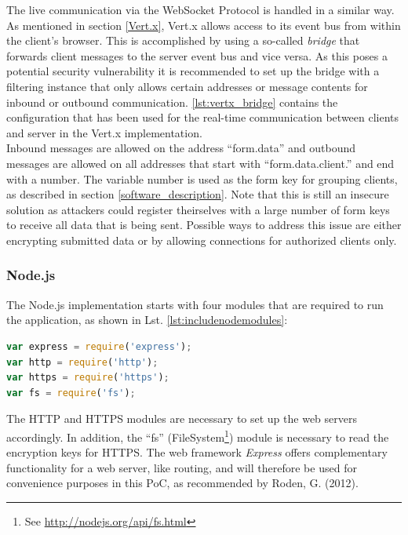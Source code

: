 The live communication via the WebSocket Protocol is handled in a similar way. As mentioned in section
\ref{Vert.x}, Vert.x allows access to its event bus from within the client's browser.
This is accomplished by using a so-called \textit{bridge} that forwards client messages to
the server event bus and vice versa. As this poses a potential security vulnerability
it is recommended to set up the bridge with a filtering instance that only allows certain
addresses or message contents for inbound or outbound communication. \autoref{lst:vertx_bridge} contains
the configuration that has been used for the real-time communication between clients
and server in the Vert.x implementation.\\
Inbound messages are allowed on the address ``form.data'' and outbound messages
are allowed on all addresses that start with ``form.data.client.'' and end with a number.
The variable number is used as the form key for grouping clients, as described in section
\ref{software_description}. Note that this is still an insecure solution as attackers
could register theirselves with a large number of form keys to receive all data that
is being sent. Possible ways to address this issue are either encrypting submitted
data or by allowing connections for authorized clients only.




\subsubsection{Node.js}
\label{implementation_node}
The Node.js implementation starts with four modules that are required to run the application, as shown in Lst. \ref{lst:includenodemodules}:

\begin{lstlisting}[language=javascript,caption={Including modules},label=lst:includenodemodules]
var express = require('express');
var http = require('http');
var https = require('https');
var fs = require('fs');
\end{lstlisting}


The HTTP and HTTPS modules are necessary to set up the web servers accordingly. 
In addition, the “fs” (FileSystem\footnote{See \url{ http://nodejs.org/api/fs.html}}) module is necessary to read the encryption keys for HTTPS. The web framework \textit{Express} offers complementary functionality for a web server, like routing, 
and will therefore be used for convenience purposes in this PoC, as recommended by Roden, G. (2012). 

